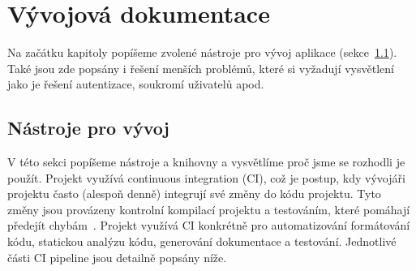 \chapter{Vývojová dokumentace}\label{ch:vyvojova-dokumentace}

Na začátku kapitoly popíšeme zvolené nástroje pro vývoj aplikace (sekce~\ref{sec:nastroje-pro-vyvoj}).
Také jsou zde popsány i řešení menších problémů, které si vyžadují vysvětlení jako je řešení autentizace, soukromí uživatelů apod.


\section{Nástroje pro vývoj}\label{sec:nastroje-pro-vyvoj}

V této sekci popíšeme nástroje a knihovny a vysvětlíme proč jsme se rozhodli je použít.
Projekt využívá continuous integration (CI), což je postup, kdy vývojáři projektu často (alespoň denně) integrují své změny do kódu projektu.
Tyto změny jsou provázeny kontrolní kompilací projektu a testováním, které pomáhají předejít chybám~\cite{ci-fowler}.
Projekt využívá CI konkrétně pro automatizování formátování kódu, statickou analýzu kódu, generování dokumentace a testování.
Jednotlivé části CI pipeline jsou detailně popsány níže.


